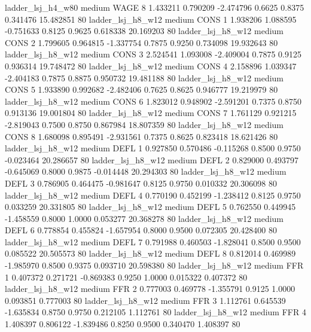      ladder_lsj_h4_w80     medium     WAGE                 8  1.433211 0.790209 -2.474796 0.6625 0.8375  0.341476   15.482851 80
     ladder_lsj_h8_w12     medium     CONS                 1  1.938206 1.088595 -0.751633 0.8125 0.9625  0.618338   20.169203 80
     ladder_lsj_h8_w12     medium     CONS                 2  1.799605 0.964815 -1.337754 0.7875 0.9250  0.734098   19.932643 80
     ladder_lsj_h8_w12     medium     CONS                 3  2.524541 1.093008 -2.409004 0.7875 0.9125  0.936314   19.748472 80
     ladder_lsj_h8_w12     medium     CONS                 4  2.158896 1.039347 -2.404183 0.7875 0.8875  0.950732   19.481188 80
     ladder_lsj_h8_w12     medium     CONS                 5  1.933890 0.992682 -2.482406 0.7625 0.8625  0.946777   19.219979 80
     ladder_lsj_h8_w12     medium     CONS                 6  1.823012 0.948902 -2.591201 0.7375 0.8750  0.913136   19.001804 80
     ladder_lsj_h8_w12     medium     CONS                 7  1.761129 0.921215 -2.819043 0.7500 0.8750  0.867984   18.807359 80
     ladder_lsj_h8_w12     medium     CONS                 8  1.680098 0.895491 -2.931561 0.7375 0.8625  0.823418   18.621426 80
     ladder_lsj_h8_w12     medium     DEFL                 1  0.927850 0.570486 -0.115268 0.8500 0.9750 -0.023464   20.286657 80
     ladder_lsj_h8_w12     medium     DEFL                 2  0.829000 0.493797 -0.645069 0.8000 0.9875 -0.014448   20.294303 80
     ladder_lsj_h8_w12     medium     DEFL                 3  0.786905 0.464475 -0.981647 0.8125 0.9750  0.010332   20.306098 80
     ladder_lsj_h8_w12     medium     DEFL                 4  0.770190 0.452199 -1.238412 0.8125 0.9750  0.033259   20.331805 80
     ladder_lsj_h8_w12     medium     DEFL                 5  0.762550 0.449945 -1.458559 0.8000 1.0000  0.053277   20.368278 80
     ladder_lsj_h8_w12     medium     DEFL                 6  0.778854 0.455824 -1.657954 0.8000 0.9500  0.072305   20.428400 80
     ladder_lsj_h8_w12     medium     DEFL                 7  0.791988 0.460503 -1.828041 0.8500 0.9500  0.085522   20.505573 80
     ladder_lsj_h8_w12     medium     DEFL                 8  0.812014 0.469989 -1.985970 0.8500 0.9375  0.093710   20.598380 80
     ladder_lsj_h8_w12     medium      FFR                 1  0.407372 0.271721 -0.869383 0.9250 1.0000  0.015322    0.407372 80
     ladder_lsj_h8_w12     medium      FFR                 2  0.777003 0.469778 -1.355791 0.9125 1.0000  0.093851    0.777003 80
     ladder_lsj_h8_w12     medium      FFR                 3  1.112761 0.645539 -1.635834 0.8750 0.9750  0.212105    1.112761 80
     ladder_lsj_h8_w12     medium      FFR                 4  1.408397 0.806122 -1.839486 0.8250 0.9500  0.340470    1.408397 80
